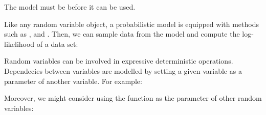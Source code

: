 \documentclass[letterpaper,10pt,english]{sphinxmanual}
\begin{document}
The model must be  before it can be used.

Like any random variable object, a probabilistic model is equipped with
methods such as  ,  and  . Then, we can sample data
from the model and compute the log-likelihood of a data set:

\begin{sphinxVerbatim}[commandchars=\\\{\}]
  
  
  
\end{sphinxVerbatim}

Random variables can be involved in expressive deterministic operations. Dependecies
between variables are modelled by setting a given variable as a parameter of another variable. For example:

\begin{sphinxVerbatim}[commandchars=\\\{\}]
   
      
       \PYG{p}{[} \PYG{p}{]} 


\end{sphinxVerbatim}

Moreover, we might consider using the function  as the parameter of other random variables:
\end{document}
